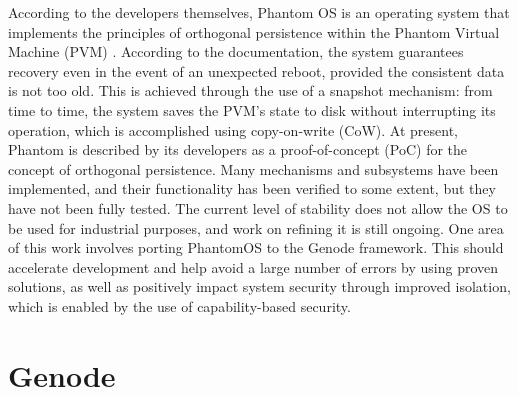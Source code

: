 According to the developers themselves, Phantom OS is an operating system that implements the principles of orthogonal persistence within the Phantom Virtual Machine (PVM) \cite{Phantom_docs, OSP_Phantom_article}. According to the documentation, the system guarantees recovery even in the event of an unexpected reboot, provided the consistent data is not too old. This is achieved through the use of a snapshot mechanism: from time to time, the system saves the PVM’s state to disk without interrupting its operation, which is accomplished using copy-on-write (CoW).
At present, Phantom is described by its developers as a proof-of-concept (PoC) for the concept of orthogonal persistence. Many mechanisms and subsystems have been implemented, and their functionality has been verified to some extent, but they have not been fully tested. The current level of stability does not allow the OS to be used for industrial purposes, and work on refining it is still ongoing.
One area of this work involves porting PhantomOS to the Genode framework. This should accelerate development and help avoid a large number of errors by using proven solutions, as well as positively impact system security through improved isolation, which is enabled by the use of capability-based security.

\section{Genode}

